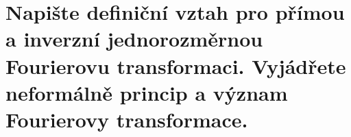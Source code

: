 \section{Napište definiční vztah pro přímou a inverzní jednorozměrnou Fourierovu transformaci. Vyjádřete neformálně 
princip a význam Fourierovy transformace.}